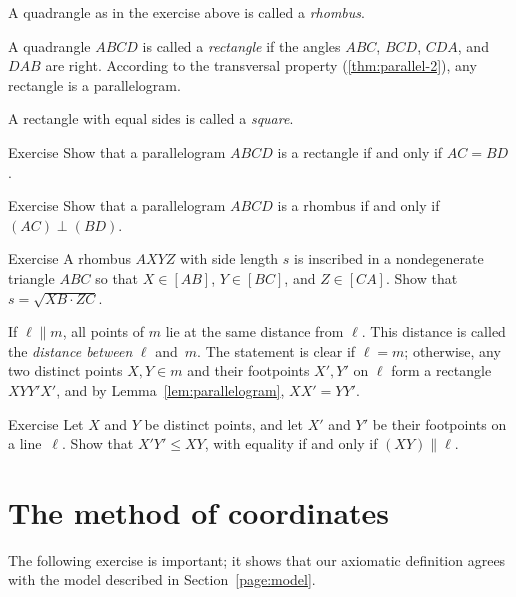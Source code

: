 A quadrangle as in the exercise above is called a \emph{rhombus}.

A quadrangle $ABCD$ is called a \emph{rectangle} if the angles $ABC$, $BCD$, $CDA$, and $DAB$ are right.
According to the transversal property (\ref{thm:parallel-2}),
any rectangle is a parallelogram.

A rectangle with equal sides is called a \emph{square}.

\begin{thm}{Exercise}\label{ex:rectangle}
Show that a parallelogram $ABCD$ is a rectangle
if and only if $AC=BD$.
\end{thm}

\begin{thm}{Exercise}\label{ex:romb2}
Show that a parallelogram $ABCD$ is a rhombus
if and only if $(AC)\perp (BD)$.
\end{thm}

\begin{thm}{Exercise}\label{ex:inscribed-rhombus}
A rhombus $AXYZ$ with side length $s$ is inscribed in a nondegenerate triangle $ABC$ so that $X\in [AB]$, $Y\in [BC]$, and $Z\in[CA]$.
Show that $s=\sqrt{XB\cdot ZC}$.
\end{thm}

If $\ell\parallel m$, all points of $m$ lie at the same distance from $\ell$.
This distance is called the \emph{distance between} $\ell$ and~$m$.
The statement is clear if $\ell=m$;
otherwise, any two distinct points $X,Y\in m$ and their footpoints $X',Y'$ on $\ell$ form a rectangle $XYY'X'$, and by Lemma~\ref{lem:parallelogram}, $XX'=YY'$.

\begin{thm}{Exercise}\label{ex:footpoints-distance}
Let $X$ and $Y$ be distinct points, and let $X'$ and $Y'$
be their footpoints on a line~$\ell$.
Show that $X'Y'\le XY$, with equality if and only if
$(XY)\parallel\ell$.
\end{thm}

\section{The method of coordinates}

The following exercise is important;
it shows that our axiomatic definition agrees with the model described in Section~\ref{page:model}.


